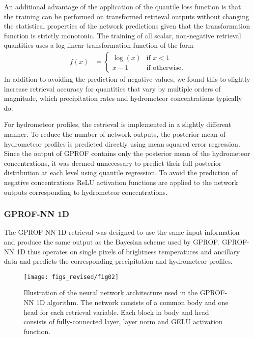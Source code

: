 \documentclass[journal abbreviation, manuscript]{copernicus}
\begin{document}
An additional advantage of the application of the quantile loss function is that
the training can be performed on transformed retrieval outputs without changing
the statistical properties of the network predictions given that the
transformation function is strictly monotonic. The training of all scalar,
non-negative retrieval quantities uses a log-linear transformation function of
the form
\begin{align}\label{eq:log_linear}
  f(x) &= \begin{cases}
    \log(x) & \text{if } x < 1 \\
    x - 1 & \text{if otherwise}.
  \end{cases}
\end{align}
In addition to avoiding the prediction of negative values, we found this to
slightly increase retrieval accuracy for quantities that vary by multiple
orders of magnitude, which precipitation rates and hydrometeor concentrations
typically do.

For hydrometeor profiles, the retrieval is implemented in a slightly different
manner. To reduce the number of network outputs, the posterior mean of
hydrometeor profiles is predicted directly using mean squared error regression.
Since the output of GPROF contains only the posterior mean of the hydrometeor
concentrations, it was deemed unnecessary to predict their full posterior
distribution at each level using quantile regression. To avoid the prediction
of negative concentrations ReLU activation functions are applied to the
network outputs corresponding to hydrometeor concentrations.

\subsubsection{GPROF-NN 1D}

The GPROF-NN 1D retrieval was designed to use the same input information and
produce the same output as the Bayesian scheme used by GPROF. GPROF-NN 1D thus
operates on single pixels of brightness temperatures and  ancillary
data and predicts the corresponding precipitation and hydrometeor profiles.

\begin{figure}[hbpt]
  \centering
    \texttt{[image: figs\_revised/fig02]}
    \caption{Illustration of the neural network architecture used in the
      GPROF-NN 1D algorithm. The network consists of a common body and
      one head for each retrieval variable. Each block in body and head
      consists of fully-connected layer, layer norm and GELU activation function.
    }
  \label{fig:gprof_nn_1d}
\end{figure}
\end{document}
